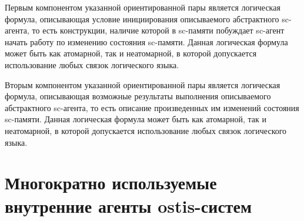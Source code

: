 \begin{SCn}
\begin{scnindent}
{    Первым компонентом указанной ориентированной пары является логическая формула, описывающая условие инициирования описываемого абстрактного sc-агента, то есть конструкции, наличие которой в sc-памяти побуждает sc-агент начать работу по изменению состояния sc-памяти. Данная логическая формула может быть как атомарной, так и неатомарной, в которой допускается использование любых связок логического языка.
    
    Вторым компонентом указанной ориентированной пары является логическая формула, описывающая возможные результаты выполнения описываемого абстрактного sc-агента, то есть описание произведенных им изменений состояния sc-памяти. Данная логическая формула может быть как атомарной, так и неатомарной, в которой допускается использование любых связок логического языка.}
\end{scnindent}
\begin{scnindent}
\end{scnindent}
\end{SCn}


\section{Многократно используемые внутренние агенты ostis-систем}

\begin{SCn}

\end{SCn}

%